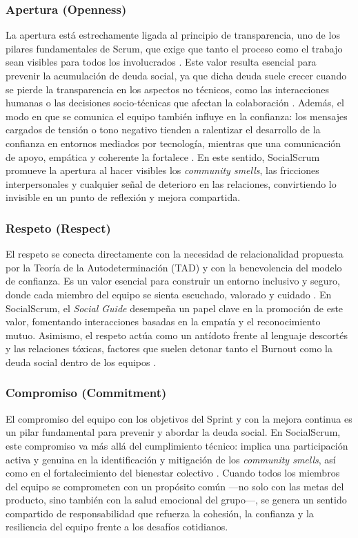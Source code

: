 \subsubsection{Apertura (Openness)}
La apertura está estrechamente ligada al principio de transparencia, uno de los pilares fundamentales de Scrum, que exige que tanto el proceso como el trabajo sean visibles para todos los involucrados \cite{wilson_all_2006,schwaber2020scrum}.
Este valor resulta esencial para prevenir la acumulación de deuda social, ya que dicha deuda suele crecer cuando se pierde la transparencia en los aspectos no técnicos, como las interacciones humanas o las decisiones socio-técnicas que afectan la colaboración \cite{schwaber2020scrum,tamburri2013socialdebt}.
Además, el modo en que se comunica el equipo también influye en la confianza: los mensajes cargados de tensión o tono negativo tienden a ralentizar el desarrollo de la confianza en entornos mediados por tecnología, mientras que una comunicación de apoyo, empática y coherente la fortalece \cite{wilson_all_2006}.
En este sentido, SocialScrum promueve la apertura al hacer visibles los \textit{community smells}, las fricciones interpersonales y cualquier señal de deterioro en las relaciones, convirtiendo lo invisible en un punto de reflexión y mejora compartida.

\subsubsection{Respeto (Respect)}
El respeto se conecta directamente con la necesidad de relacionalidad propuesta por la Teoría de la Autodeterminación (TAD) y con la benevolencia del modelo de confianza.
Es un valor esencial para construir un entorno inclusivo y seguro, donde cada miembro del equipo se sienta escuchado, valorado y cuidado \cite{ryan_self-determination_2000}.
En SocialScrum, el \textit{Social Guide} desempeña un papel clave en la promoción de este valor, fomentando interacciones basadas en la empatía y el reconocimiento mutuo.
Asimismo, el respeto actúa como un antídoto frente al lenguaje descortés y las relaciones tóxicas, factores que suelen detonar tanto el Burnout como la deuda social dentro de los equipos \cite{tulili2022burnout}.

\subsubsection{Compromiso (Commitment)}
El compromiso del equipo con los objetivos del Sprint y con la mejora continua es un pilar fundamental para prevenir y abordar la deuda social.
En SocialScrum, este compromiso va más allá del cumplimiento técnico: implica una participación activa y genuina en la identificación y mitigación de los \textit{community smells}, así como en el fortalecimiento del bienestar colectivo \cite{caballero2022communitysmells}.
Cuando todos los miembros del equipo se comprometen con un propósito común —no solo con las metas del producto, sino también con la salud emocional del grupo—, se genera un sentido compartido de responsabilidad que refuerza la cohesión, la confianza y la resiliencia del equipo frente a los desafíos cotidianos.

